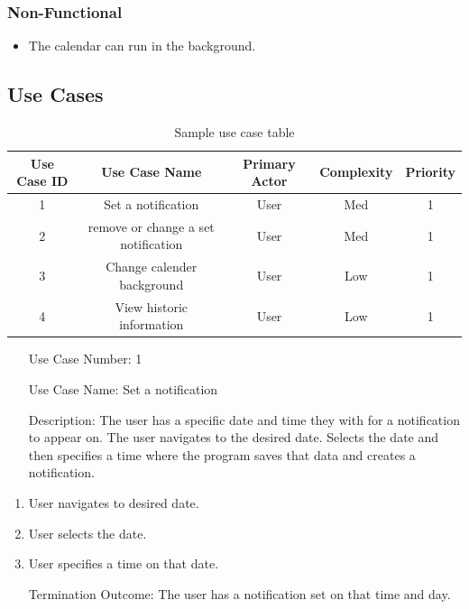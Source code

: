 \documentclass[10pt,conference,onecolumn,compsoc]{IEEEtran}
\begin{document}
\subsubsection{Non-Functional}
\begin{itemize}
\item The calendar can run in the background.
\end{itemize}

\subsection{Use Cases}

\begin{table}
\centering
\begin{tabular}{|c|c|c|c|c|}
\hline
Use Case ID & Use Case Name & Primary Actor & Complexity & Priority\\
\hline
1 & Set a notification & User & Med & 1\\
\hline
2 & remove or change a set notification & User & Med & 1\\
\hline
3 & Change calender background & User & Low & 1\\
\hline
4 & View historic information & User & Low & 1\\
\hline
\end{tabular}
\caption{Sample use case table}
\label{tab:useCaseIndex}
\end{table}

\begin{itemize}
\item[Use Case Number:] 1
\item[Use Case Name:] Set a notification
\item[Description:] The user has a specific date and time they with for a notification to appear on. The user navigates to the desired date. Selects the date and then specifies a time where the program saves that data and creates a notification.
\end{itemize}

\begin{enumerate}
\item User navigates to desired date.
\item User selects the date.
\item User specifies a time on that date.
\item[Termination Outcome:] The user has a notification set on that time and day.
\end{enumerate}
\end{document}
